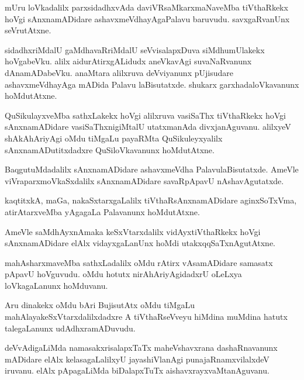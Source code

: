 \documentclass{article}
\begin{document}
\begin{mn}
mUru loVkadalilx parxsidadhxvAda daviVRsaMkarxmaNaveMba tiVthaRkekx hoVgi sAnxnamADidare 
ashavxmeVdhayAgaPalavu baruvudu. savxgaRvanUnx seVrutAtxne. 
\end{mn}

\begin{mn}
sidadhxriMdalU gaMdhavaRriMdalU seVvisalapxDuva siMdhumUlakekx hoVgabeVku. alilx 
aidurAtirxgALidudx aneVkavAgi suvaNaRvanunx dAnamADabeVku. anaMtara alilxruva deVviyanunx 
pUjisudare ashavxmeVdhayAga mADida Palavu  laBisutatxde. shukarx garxhadaloVkavanunx hoMdutAtxne.
\end{mn}

\begin{mn}
QuSikulayxveMba sathxLakekx hoVgi alilxruva vasiSaThx tiVthaRkekx  hoVgi sAnxnamADidare 
vasiSaThxnigiMtalU utatxmanAda divxjanAguvanu. alilxyeV shAkAhAriyAgi oMdu tiMgaLu payaRMta 
QuSikuleyxyalilx sAnxnamADutitxdadxre QuSiloVkavanunx hoMdutAtxne.
\end{mn}

\begin{mn}
BaqgutuMdadalilx sAnxnamADidare ashavxmeVdha PalavulaBisutatxde. AmeVle viVraparxmoVkaSxdalilx 
sAnxnamADidare savaRpApavU nAshavAgutatxde.
\end{mn}

\begin{mn}
kaqtitxkA, maGa, nakaSxtarxgaLalilx tiVthaRsAnxnamADidare aginxSoTxVma, atirAtarxveMba yAgagaLa 
Palavanunx hoMdutAtxne.
\end{mn}

\begin{mn}
AmeVle saMdhAyxnAmaka keSxVtarxdalilx vidAyxtiVthaRkekx hoVgi sAnxnamADidare elAlx vidayxgaLanUnx 
hoMdi utakxqqSaTxnAgutAtxne.
\end{mn}

\begin{mn}
mahAsharxmaveMba sathxLadalilx oMdu rAtirx vAsamADidare samasatx pApavU hoVguvudu. oMdu  hotutx 
nirAhAriyAgidadxrU oLeLxya loVkagaLanunx hoMduvanu.
\end{mn}

\begin{mn}
Aru dinakekx oMdu bAri BujisutAtx oMdu tiMgaLu mahAlayakeSxVtarxdalilxdadxre A tiVthaRseVveyu 
hiMdina muMdina hatutx talegaLanunx udAdhxramADuvudu.
\end{mn}

\begin{mn}
deVvAdigaLiMda namasakxrisalapxTaTx maheVshavxrana dashaRnavanunx mADidare elAlx kelasagaLalilxyU 
jayashiVlanAgi punajaRnamxvilalxdeV iruvanu. elAlx pApagaLiMda biDalapxTuTx 
aishavxrayxvaMtanAguvanu.
\end{mn}
\end{document}
